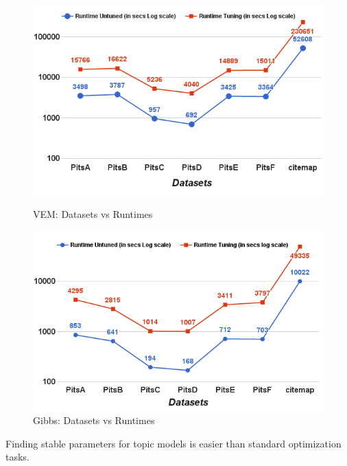 \documentclass[10pt,conference]{IEEEtran}
\theoremstyle{break}
\begin{document}
\begin{figure}[!t]
    \centering
  \begin{minipage}{.49\textwidth}
        \captionsetup{labelsep=space,justification=centering,singlelinecheck=off}
        \includegraphics[width=\linewidth]{./fig/Run_VEM_sci.png}
  \caption{VEM: Datasets vs Runtimes}
  \label{RQ5 VEM}
  \end{minipage}
  \begin{minipage}{.49\textwidth}
        \captionsetup{justification=centering,singlelinecheck=off}
        \includegraphics[width=\linewidth]{./fig/Run_gibbs_sci.png}
  \caption{Gibbs: Datasets vs Runtimes}
  \label{RQ5 Gibbs}
    \end{minipage}%
    
\end{figure}

\begin{lesson}
  Finding stable parameters for
  topic models is easier than standard optimization tasks.
\end{lesson}
\end{document}
